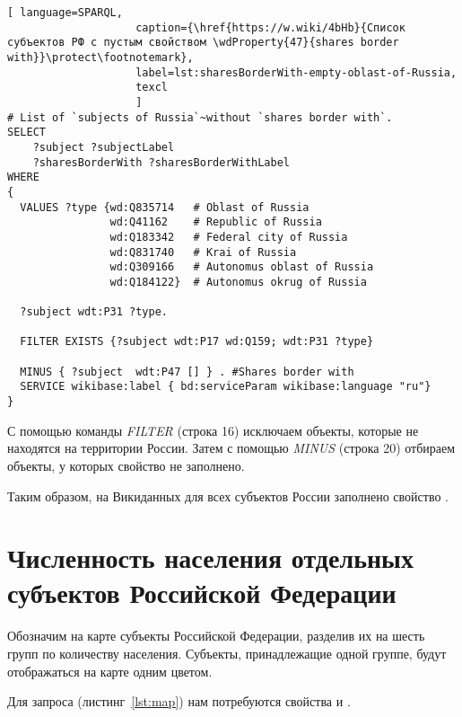 \lstset{numbers=left, firstnumber=1, frame=single}
\begin{lstlisting}[ language=SPARQL, 
                    caption={\href{https://w.wiki/4bHb}{Список субъектов РФ с пустым свойством \wdProperty{47}{shares border with}}\protect\footnotemark},
                    label=lst:sharesBorderWith-empty-oblast-of-Russia,
                    texcl 
                    ]
# List of `subjects of Russia`~without `shares border with`. 
SELECT 
    ?subject ?subjectLabel 
    ?sharesBorderWith ?sharesBorderWithLabel
WHERE
{
  VALUES ?type {wd:Q835714   # Oblast of Russia
                wd:Q41162    # Republic of Russia
                wd:Q183342   # Federal city of Russia
                wd:Q831740   # Krai of Russia
                wd:Q309166   # Autonomus oblast of Russia
                wd:Q184122}  # Autonomus okrug of Russia
  
  ?subject wdt:P31 ?type.
  
  FILTER EXISTS {?subject wdt:P17 wd:Q159; wdt:P31 ?type}
  
  MINUS { ?subject  wdt:P47 [] } . #Shares border with 
  SERVICE wikibase:label { bd:serviceParam wikibase:language "ru"}
}
\end{lstlisting}%

С помощью команды \textit{FILTER} (строка 16) исключаем объекты, которые не находятся на территории России. Затем с помощью \textit{MINUS} (строка 20) отбираем объекты, у которых свойство  не заполнено.

Таким образом, на Викиданных для всех субъектов России заполнено свойство .

\section{Численность населения отдельных субъектов Российской Федерации}

Обозначим на карте субъекты Российской Федерации, разделив их на шесть групп по количеству населения. Субъекты, принадлежащие одной группе, будут отображаться на карте одним цветом.

Для запроса (листинг~\protect\ref{lst:map}) нам потребуются свойства  и .

